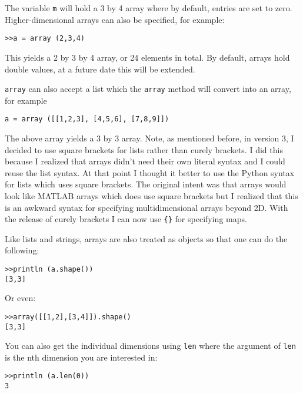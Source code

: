 The variable {\tt m} will hold a 3 by 4 array where by default, entries are set to zero. Higher-dimensional arrays can also be specified, for example:

\begin{lstlisting}
>>a = array (2,3,4)
\end{lstlisting}

This yields a 2 by 3 by 4 array, or 24 elements in total. By default, arrays hold double values, at a future date this will be extended.

{\tt array} can also accept a list which the {\tt array} method will convert into an array, for example

\begin{lstlisting}
a = array ([[1,2,3], [4,5,6], [7,8,9]])
\end{lstlisting}

The above array yields a 3 by 3 array. Note, as mentioned before, in version 3, I decided to use square brackets for lists rather than curely brackets. I did this because I realized that arrays didn't need their own literal syntax and I could reuse the list syntax. At that point I thought it better to use the Python syntax for lists which uses square brackets. The original intent was that arrays would look like MATLAB arrays which does use square brackets but I realized that this is an awkward syntax for specifying multidimensional arrays beyond 2D. With the release of curely brackets I can now use {\tt \verb|{|\verb|}|} for specifying maps.

Like lists and strings, arrays are also treated as objects so that one can do the following:

\begin{lstlisting}
>>println (a.shape())
[3,3]
\end{lstlisting}

Or even:

\begin{lstlisting}
>>array([[1,2],[3,4]]).shape()
[3,3]
\end{lstlisting}

You can also get the individual dimensions using {\tt len} where the argument of {\tt len} is the nth dimension you are interested in:

\begin{lstlisting}
>>println (a.len(0))
3
\end{lstlisting}


